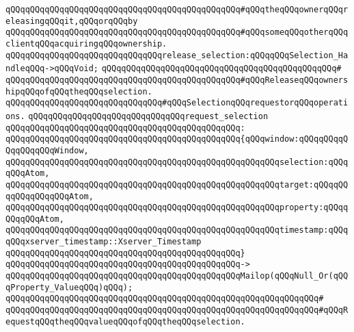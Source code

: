 \verb|qQQqqQQqqQQqqQQqqQQqqQQqqQQqqQQqqQQqqQQqqQQqqQQq#qQQqtheqQQqownerqQQqreleasingqQQqit,qQQqorqQQqby|\newline
\verb|qQQqqQQqqQQqqQQqqQQqqQQqqQQqqQQqqQQqqQQqqQQqqQQq#qQQqsomeqQQqotherqQQqclientqQQqacquiringqQQqownership.|\newline
\newline
\newline
\verb|qQQqqQQqqQQqqQQqqQQqqQQqqQQqqQQqrelease_selection:qQQqqQQqSelection_HandleqQQq->qQQqVoid;|\newline
\verb|qQQqqQQqqQQqqQQqqQQqqQQqqQQqqQQqqQQqqQQqqQQqqQQq#|\newline
\verb|qQQqqQQqqQQqqQQqqQQqqQQqqQQqqQQqqQQqqQQqqQQqqQQq#qQQqReleaseqQQqownershipqQQqofqQQqtheqQQqselection.|\newline
\newline
\newline
\verb|qQQqqQQqqQQqqQQqqQQqqQQqqQQqqQQq#qQQqSelectionqQQqrequestorqQQqoperations.|\newline
\newline
\verb|qQQqqQQqqQQqqQQqqQQqqQQqqQQqqQQqrequest_selection|\newline
\verb|qQQqqQQqqQQqqQQqqQQqqQQqqQQqqQQqqQQqqQQqqQQqqQQq:|\newline
\verb|qQQqqQQqqQQqqQQqqQQqqQQqqQQqqQQqqQQqqQQqqQQqqQQq{qQQqwindow:qQQqqQQqqQQqqQQqqQQqWindow,|\newline
\verb|qQQqqQQqqQQqqQQqqQQqqQQqqQQqqQQqqQQqqQQqqQQqqQQqqQQqqQQqselection:qQQqqQQqAtom,|\newline
\verb|qQQqqQQqqQQqqQQqqQQqqQQqqQQqqQQqqQQqqQQqqQQqqQQqqQQqqQQqtarget:qQQqqQQqqQQqqQQqqQQqAtom,|\newline
\verb|qQQqqQQqqQQqqQQqqQQqqQQqqQQqqQQqqQQqqQQqqQQqqQQqqQQqqQQqproperty:qQQqqQQqqQQqAtom,|\newline
\verb|qQQqqQQqqQQqqQQqqQQqqQQqqQQqqQQqqQQqqQQqqQQqqQQqqQQqqQQqtimestamp:qQQqqQQqxserver_timestamp::Xserver_Timestamp|\newline
\verb|qQQqqQQqqQQqqQQqqQQqqQQqqQQqqQQqqQQqqQQqqQQqqQQq}|\newline
\verb|qQQqqQQqqQQqqQQqqQQqqQQqqQQqqQQqqQQqqQQqqQQqqQQq->|\newline
\verb|qQQqqQQqqQQqqQQqqQQqqQQqqQQqqQQqqQQqqQQqqQQqqQQqMailop(qQQqNull_Or(qQQqProperty_ValueqQQq)qQQq);|\newline
\verb|qQQqqQQqqQQqqQQqqQQqqQQqqQQqqQQqqQQqqQQqqQQqqQQqqQQqqQQqqQQqqQQq#|\newline
\verb|qQQqqQQqqQQqqQQqqQQqqQQqqQQqqQQqqQQqqQQqqQQqqQQqqQQqqQQqqQQqqQQq#qQQqRequestqQQqtheqQQqvalueqQQqofqQQqtheqQQqselection.|\newline
